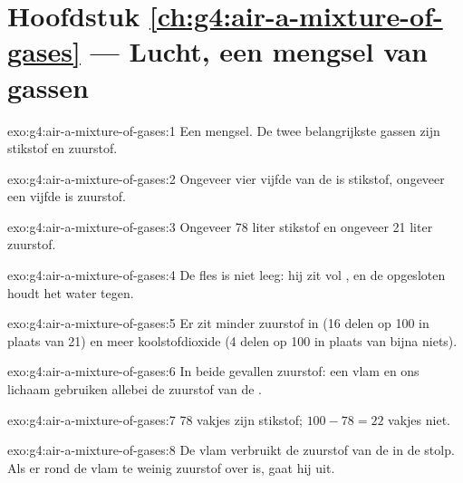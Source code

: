 \section*{Hoofdstuk \ref{ch:g4:air-a-mixture-of-gases} --- Lucht, een mengsel van gassen}

\begin{solution}{exo:g4:air-a-mixture-of-gases:1}
Een mengsel. De twee belangrijkste gassen zijn stikstof en zuurstof.
\end{solution}

\begin{solution}{exo:g4:air-a-mixture-of-gases:2}
Ongeveer vier vijfde van de  is stikstof, ongeveer een vijfde is
zuurstof.
\end{solution}

\begin{solution}{exo:g4:air-a-mixture-of-gases:3}
Ongeveer 78 liter stikstof en ongeveer 21 liter zuurstof.
\end{solution}

\begin{solution}{exo:g4:air-a-mixture-of-gases:4}
De fles is niet leeg: hij zit vol , en de opgesloten  houdt
het water tegen.
\end{solution}

\begin{solution}{exo:g4:air-a-mixture-of-gases:5}
Er zit minder zuurstof in (16 delen op 100 in plaats van 21) en meer
koolstofdioxide (4 delen op 100 in plaats van bijna niets).
\end{solution}

\begin{solution}{exo:g4:air-a-mixture-of-gases:6}
In beide gevallen zuurstof: een vlam en ons lichaam gebruiken allebei de
zuurstof van de .
\end{solution}

\begin{solution}{exo:g4:air-a-mixture-of-gases:7}
78 vakjes zijn stikstof; $100 - 78 = 22$ vakjes niet.
\end{solution}

\begin{solution}{exo:g4:air-a-mixture-of-gases:8}
De vlam verbruikt de zuurstof van de  in de stolp. Als er rond de
vlam te weinig zuurstof over is, gaat hij uit.
\end{solution}

